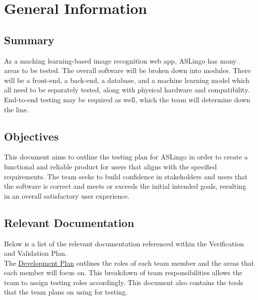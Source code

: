 \documentclass[12pt, titlepage]{article}
\begin{document}
\newpage


\section{General Information}

\subsection{Summary}

As a maching learning-based image recognition web app, ASLingo has many areas to be tested. The overall software will be broken down into modules. There will be a front-end, a back-end, a database, and a machine learning model which all need to be separately tested, along with physical hardware and compatibility. End-to-end testing may be required as well, which the team will determine down the line.

\subsection{Objectives}

This document aims to outline the testing plan for ASLingo in order to create a functional and reliable product for users that aligns with the specified requirements. The team seeks to build confidence in stakeholders and users that the software is correct and meets or exceeds the initial intended goals, resulting in an overall satisfactory user experience.

\subsection{Relevant Documentation} 

Below is a list of the relevant documentation referenced within the Verification and Validation Plan.\\


\noindent The \href{https://github.com/stanreee/sign-language-learning/blob/main/docs/DevelopmentPlan/DevelopmentPlan.pdf}{Development Plan} outlines the roles of each team member and the areas that each member will focus on. This breakdown of team responsibilities allows the team to assign testing roles accordingly. This document also contains the tools that the team plans on using for testing.\\
\end{document}
